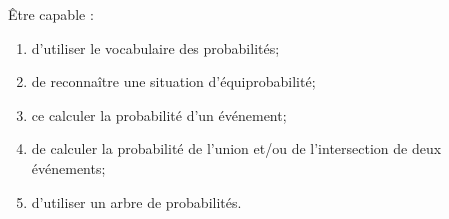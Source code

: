\begin{myobj}
	Être capable : 
	\begin{enumerate}
		\item d'utiliser le vocabulaire des probabilités;
		\item de reconnaître une situation d'équiprobabilité;
		\item ce calculer la probabilité d'un événement; 
		\item de calculer la probabilité de l'union et/ou de l'intersection de deux événements;
		\item d'utiliser un arbre de probabilités.
	\end{enumerate}
\end{myobj}